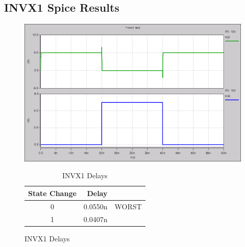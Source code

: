         \newpage
        \subsection{INVX1 Spice Results}
        
        \begin{figure}[H]
            \centering
            \begin{minipage}[t]{.50\textwidth}
                \vspace{0pt}
                \centering
                \includegraphics[width=\linewidth]{../../spice/invx1.png}
                \caption{INVX1 Spice Results}
            \end{minipage}
            \hfill
            \begin{minipage}[t]{.45\textwidth}
                \vspace{0pt}
                \begin{table}[H]
                    \centering
                    \begin{tabular}{crc}
                        \toprule
                        \textbf{State Change} & \textbf{Delay} & \\
                        \midrule
                        0 & 0.0550n & WORST \\
                        1 & 0.0407n & \\
                        \bottomrule
                    \end{tabular}
                    \caption{INVX1 Delays}
                \end{table}
            \end{minipage}
        \end{figure}

